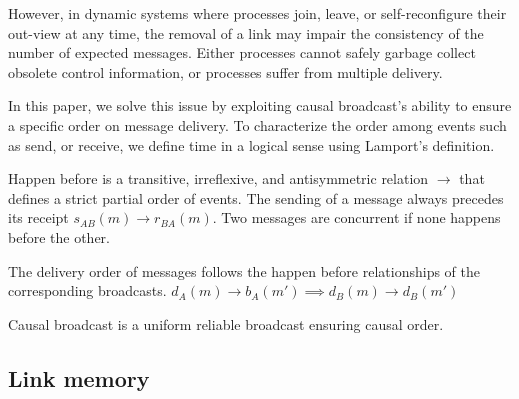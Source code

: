 However, in dynamic systems where processes join, leave, or self-reconfigure
their out-view at any time, the removal of a link may impair the consistency of
the number of expected messages. Either processes cannot safely garbage collect
obsolete control information, or processes suffer from multiple delivery.

In this paper, we solve this issue by exploiting causal broadcast's ability to
ensure a specific order on message delivery. To characterize the order among
events such as send, or receive, we define time in a logical sense using
Lamport’s definition.

\begin{definition}
  Happen before is a transitive, irreflexive, and antisymmetric relation
  $\rightarrow$ that defines a strict partial order of events. The sending of a
  message always precedes its receipt $s_{AB}(m) \rightarrow r_{BA}(m)$. Two
  messages are concurrent if none happens before the other.
\end{definition}

\begin{definition}
  The delivery order of messages follows the happen before relationships of the
  corresponding broadcasts.
  $d_A(m) \rightarrow b_A(m') \implies d_B(m) \rightarrow d_B(m')$
\end{definition}

\begin{definition}
  Causal broadcast is a uniform reliable broadcast ensuring causal order.
\end{definition}


\subsection{Link memory}

